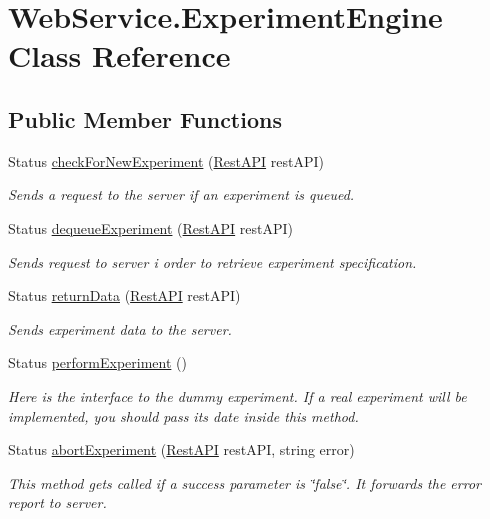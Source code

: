 \hypertarget{class_web_service_1_1_experiment_engine}{}\section{Web\+Service.\+Experiment\+Engine Class Reference}
\label{class_web_service_1_1_experiment_engine}
\subsection*{Public Member Functions}
\begin{DoxyCompactItemize}
\item 
Status \hyperlink{class_web_service_1_1_experiment_engine_ab26c0f9858c2957df8d265abbafdf458}{check\+For\+New\+Experiment} (\hyperlink{class_web_service_1_1_rest_a_p_i}{Rest\+A\+P\+I} rest\+A\+P\+I)
\begin{DoxyCompactList}\small\item\em Sends a request to the server if an experiment is queued. \end{DoxyCompactList}\item 
Status \hyperlink{class_web_service_1_1_experiment_engine_a7aa063527b64d6c67dcc5367c19b627b}{dequeue\+Experiment} (\hyperlink{class_web_service_1_1_rest_a_p_i}{Rest\+A\+P\+I} rest\+A\+P\+I)
\begin{DoxyCompactList}\small\item\em Sends request to server i order to retrieve experiment specification. \end{DoxyCompactList}\item 
Status \hyperlink{class_web_service_1_1_experiment_engine_aedaffdb21915bc99c364d254cb8ed7e2}{return\+Data} (\hyperlink{class_web_service_1_1_rest_a_p_i}{Rest\+A\+P\+I} rest\+A\+P\+I)
\begin{DoxyCompactList}\small\item\em Sends experiment data to the server. \end{DoxyCompactList}\item 
Status \hyperlink{class_web_service_1_1_experiment_engine_a182328674dd170c392c8da1b3ec7d85c}{perform\+Experiment} ()
\begin{DoxyCompactList}\small\item\em Here is the interface to the dummy experiment. If a real experiment will be implemented, you should pass its date inside this method. \end{DoxyCompactList}\item 
Status \hyperlink{class_web_service_1_1_experiment_engine_a8c3b5998c15bfa07b418115555975259}{abort\+Experiment} (\hyperlink{class_web_service_1_1_rest_a_p_i}{Rest\+A\+P\+I} rest\+A\+P\+I, string error)
\begin{DoxyCompactList}\small\item\em This method gets called if a success parameter is \char`\"{}false\char`\"{}. It forwards the error report to server. \end{DoxyCompactList}\end{DoxyCompactItemize}
